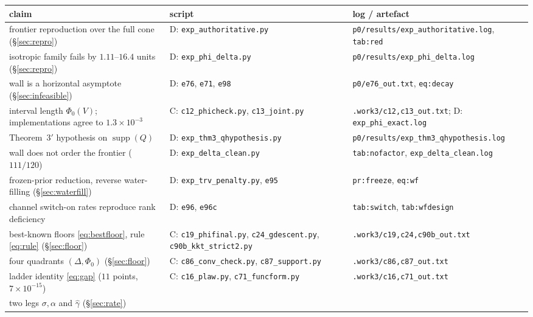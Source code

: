 \begin{table}[t]\centering\scriptsize
\begin{tabular}{@{}>{\raggedright\arraybackslash}p{5.2cm}>{\raggedright\arraybackslash}p{5.6cm}>{\raggedright\arraybackslash}p{5.8cm}@{}}
\toprule
claim & script & log / artefact \\
\midrule
frontier reproduction over the full cone (\S\ref{sec:repro})
  & D: \texttt{exp\_authoritative.py}
  & \texttt{p0/results/exp\_authoritative.log}, \texttt{tab:red} \\
isotropic family fails by $1.11$--$16.4$ units (\S\ref{sec:repro})
  & D: \texttt{exp\_phi\_delta.py}
  & \texttt{p0/results/exp\_phi\_delta.log} \\
wall is a horizontal asymptote (\S\ref{sec:infeasible})
  & D: \texttt{e76}, \texttt{e71}, \texttt{e98}
  & \texttt{p0/e76\_out.txt}, \texttt{eq:decay} \\
interval length $\Phi_0(V)$; implementations agree to $1.3\times10^{-3}$
  & C: \texttt{c12\_phicheck.py}, \texttt{c13\_joint.py}
  & \texttt{.work3/c12,c13\_out.txt}; D: \texttt{exp\_phi\_exact.log} \\
Theorem~3$'$ hypothesis on $\operatorname{supp}(Q)$
  & D: \texttt{exp\_thm3\_qhypothesis.py}
  & \texttt{p0/results/exp\_thm3\_qhypothesis.log} \\
wall does not order the frontier ($111/120$)
  & D: \texttt{exp\_delta\_clean.py}
  & \texttt{tab:nofactor}, \texttt{exp\_delta\_clean.log} \\
frozen-prior reduction, reverse water-filling (\S\ref{sec:waterfill})
  & D: \texttt{exp\_trv\_penalty.py}, \texttt{e95}
  & \texttt{pr:freeze}, \texttt{eq:wf} \\
channel switch-on rates reproduce rank deficiency
  & D: \texttt{e96}, \texttt{e96c}
  & \texttt{tab:switch}, \texttt{tab:wfdesign} \\
best-known floors \eqref{eq:bestfloor}, rule \eqref{eq:rule} (\S\ref{sec:floor})
  & C: \texttt{c19\_phifinal.py}, \texttt{c24\_gdescent.py}, \texttt{c90b\_kkt\_strict2.py}
  & \texttt{.work3/c19,c24,c90b\_out.txt} \\
four quadrants $(\Delta,\Phi_0)$ (\S\ref{sec:floor})
  & C: \texttt{c86\_conv\_check.py}, \texttt{c87\_support.py}
  & \texttt{.work3/c86,c87\_out.txt} \\
ladder identity \eqref{eq:gap} ($11$ points, $7\times10^{-15}$)
  & C: \texttt{c16\_plaw.py}, \texttt{c71\_funcform.py}
  & \texttt{.work3/c16,c71\_out.txt} \\
two legs $\sigma,\alpha$ and $\hat\gamma$ (\S\ref{sec:rate})

\end{tabular}
\end{table}
